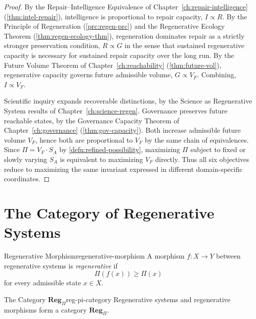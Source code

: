 \documentclass[12pt,twoside,openright]{book}
\begin{document}
\begin{proof}
  By the Repair--Intelligence Equivalence of
  Chapter~\ref{ch:repair-intelligence}
  (\cref{thm:intel-repair}), intelligence is proportional to
  repair capacity, $I\propto R$. By the Principle of
  Regeneration (\cref{prc:regen-prc}) and the Regenerative
  Ecology Theorem (\cref{thm:regen-ecology-thm}),
  regeneration dominates repair as a strictly stronger
  preservation condition, $R\propto G$ in the sense that
  sustained regenerative capacity is necessary for sustained
  repair capacity over the long run. By the Future Volume
  Theorem of Chapter~\ref{ch:reachability}
  (\cref{thm:future-vol}), regenerative capacity governs
  future admissible volume, $G\propto V_F$. Combining,
  $I\propto V_F$.

  Scientific inquiry expands recoverable distinctions, by
  the Science as Regenerative System results of
  Chapter~\ref{ch:science-regen}. Governance preserves
  future reachable states, by the Governance Capacity
  Theorem of Chapter~\ref{ch:governance}
  (\cref{thm:gov-capacity}). Both increase admissible future
  volume $V_F$, hence both are proportional to $V_F$ by the
  same chain of equivalences. Since $\Pi = V_F\cdot S_A$ by
  \cref{defn:refined-possibility}, maximizing $\Pi$ subject
  to fixed or slowly varying $S_A$ is equivalent to
  maximizing $V_F$ directly. Thus all six objectives reduce
  to maximizing the same invariant expressed in different
  domain-specific coordinates.
\end{proof}

\section{The Category of Regenerative Systems}
\label{sec:ch31-category}

\begin{definition}{Regenerative Morphism}{regenerative-morphism}
  A morphism $f:X\to Y$ between regenerative systems is
  \emph{regenerative} if
  \[
    \Pi(f(x)) \ge \Pi(x)
  \]
  for every admissible state $x\in X$.
\end{definition}

\begin{theorem}{The Category $\mathbf{Reg}_\Pi$}{reg-pi-category}
  Regenerative systems and regenerative morphisms form a
  category $\mathbf{Reg}_\Pi$.
\end{theorem}
\end{document}
